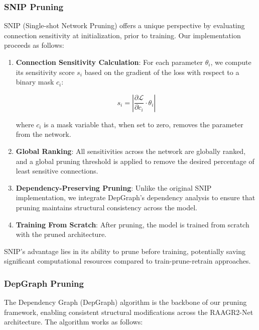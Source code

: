\documentclass[12pt,a4paper]{article}
\begin{document}
\begin{enumerate}
\subsubsection{SNIP Pruning}

SNIP (Single-shot Network Pruning) \cite{Lee2019SNIP} offers a unique perspective by evaluating connection sensitivity at initialization, prior to training. Our implementation proceeds as follows:

\begin{enumerate}
\item \textbf{Connection Sensitivity Calculation}: For each parameter $\theta_i$, we compute its sensitivity score $s_i$ based on the gradient of the loss with respect to a binary mask $c_i$:
   
   \begin{equation}
   s_i = \left|\frac{\partial \mathcal{L}}{\partial c_i} \cdot \theta_i \right|
   \end{equation}
   
   where $c_i$ is a mask variable that, when set to zero, removes the parameter from the network.

\item \textbf{Global Ranking}: All sensitivities across the network are globally ranked, and a global pruning threshold is applied to remove the desired percentage of least sensitive connections.

\item \textbf{Dependency-Preserving Pruning}: Unlike the original SNIP implementation, we integrate DepGraph's dependency analysis \cite{Fang2023DepGraph} to ensure that pruning maintains structural consistency across the model.

\item \textbf{Training From Scratch}: After pruning, the model is trained from scratch with the pruned architecture.
\end{enumerate}

SNIP's advantage lies in its ability to prune before training, potentially saving significant computational resources compared to train-prune-retrain approaches.

\subsubsection{DepGraph Pruning}

The Dependency Graph (DepGraph) algorithm \cite{Fang2023DepGraph, Cai2022Dependency} is the backbone of our pruning framework, enabling consistent structural modifications across the RAAGR2-Net architecture. The algorithm works as follows:


\end{enumerate}
\end{document}
